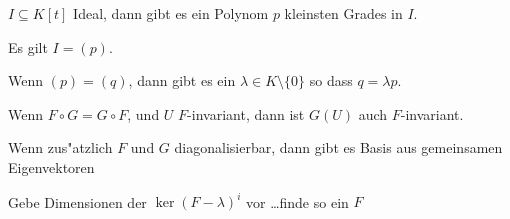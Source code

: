 \documentclass[a4,11pt]{article}
\begin{document}
\vspace*{-17mm}
{
\kopf
}


\begin{aufgabe}[4 Punkte]
$I \subseteq K[t]$ Ideal, dann gibt es ein Polynom $p$ kleinsten
Grades in $I$.

Es gilt $I = (p)$.

Wenn $(p) = (q)$, dann gibt es ein $\lambda \in K \setminus \{0\}$ so
dass $q = \lambda p$.

\end{aufgabe}

\begin{aufgabe}[4 Punkte]
Wenn $F \circ G = G \circ F$, und $U$ $F$-invariant, dann ist $G(U)$
auch $F$-invariant.

Wenn zus"atzlich $F$ und $G$ diagonalisierbar, dann gibt es Basis aus
gemeinsamen Eigenvektoren
\end{aufgabe}


\begin{aufgabe}[4 Punkte]
Gebe Dimensionen der $\ker (F -\lambda)^i$ vor \ldots finde so ein $F$  
\end{aufgabe}
\end{document}
